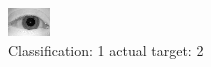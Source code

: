 \begin{figure}[h!]
\begin{center}
\includegraphics[width=0.60\columnwidth]{figures/ID995_class_1_target_2.png}
\end{center}
\caption{ Classification: 1 actual target: 2}
\label{fig:ID995_class_1_target_2}
\end{figure}
